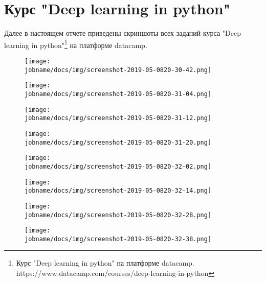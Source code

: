 \section*{Курс "Deep learning in python"}

Далее в настоящем отчете приведены скриншоты всех заданий курса
"Deep learning in python"\footnote{Курс "Deep learning in python" на платформе datacamp. https://www.datacamp.com/courses/deep-learning-in-python}
на платформе datacamp.

\begin{figure}[h!]
    \centering
    \texttt{[image: \\jobname/docs/img/screenshot-2019-05-0820-30-42.png]}
\end{figure}

\begin{figure}[h!]
    \centering
    \texttt{[image: \\jobname/docs/img/screenshot-2019-05-0820-31-04.png]}
\end{figure}

\begin{figure}[h!]
    \centering
    \texttt{[image: \\jobname/docs/img/screenshot-2019-05-0820-31-12.png]}
\end{figure}

\begin{figure}[h!]
    \centering
    \texttt{[image: \\jobname/docs/img/screenshot-2019-05-0820-31-20.png]}
\end{figure}

\begin{figure}[h!]
    \centering
    \texttt{[image: \\jobname/docs/img/screenshot-2019-05-0820-32-02.png]}
\end{figure}

\begin{figure}[h!]
    \centering
    \texttt{[image: \\jobname/docs/img/screenshot-2019-05-0820-32-14.png]}
\end{figure}

\begin{figure}[h!]
    \centering
    \texttt{[image: \\jobname/docs/img/screenshot-2019-05-0820-32-28.png]}
\end{figure}

\begin{figure}[h!]
    \centering
    \texttt{[image: \\jobname/docs/img/screenshot-2019-05-0820-32-38.png]}
\end{figure}

